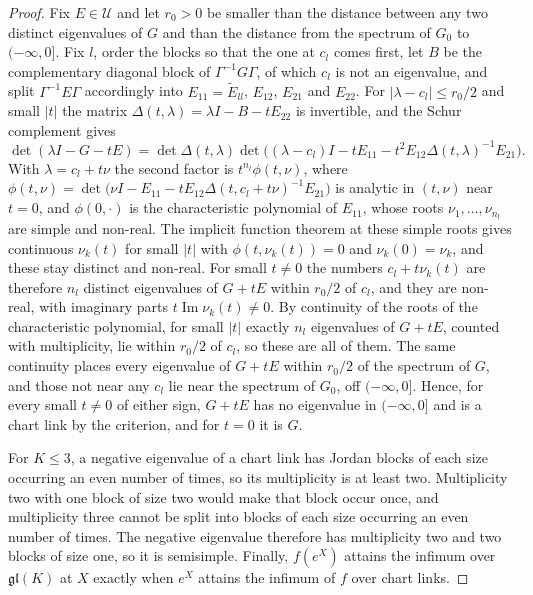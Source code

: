 \documentclass[11pt]{article}
\theoremstyle{definition}
\theoremstyle{remark}
\providecommand{\gl}{\mathfrak{gl}}
\begin{document}
\begin{proof}
Fix $E\in\mathcal U$ and let $r_0>0$ be smaller than the distance between any two distinct eigenvalues of $G$ and than the distance from the spectrum of $G_0$ to $(-\infty,0]$. Fix $l$, order the blocks so that the one at $c_l$ comes first, let $B$ be the complementary diagonal block of $\Gamma^{-1}G\Gamma$, of which $c_l$ is not an eigenvalue, and split $\Gamma^{-1}E\Gamma$ accordingly into $E_{11}=\tilde E_{ll}$, $E_{12}$, $E_{21}$ and $E_{22}$. For $|\lambda-c_l|\le r_0/2$ and small $|t|$ the matrix $\Delta(t,\lambda)=\lambda I-B-tE_{22}$ is invertible, and the Schur complement gives
\begin{equation*}
\det(\lambda I-G-tE)=\det \Delta(t,\lambda)\det\big((\lambda-c_l)I-tE_{11}-t^2E_{12}\Delta(t,\lambda)^{-1}E_{21}\big).
\end{equation*}
With $\lambda=c_l+t\nu$ the second factor is $t^{n_l}\phi(t,\nu)$, where $\phi(t,\nu)=\det\big(\nu I-E_{11}-tE_{12}\Delta(t,c_l+t\nu)^{-1}E_{21}\big)$ is analytic in $(t,\nu)$ near $t=0$, and $\phi(0,\cdot)$ is the characteristic polynomial of $E_{11}$, whose roots $\nu_1,\dots,\nu_{n_l}$ are simple and non-real. The implicit function theorem at these simple roots gives continuous $\nu_k(t)$ for small $|t|$ with $\phi(t,\nu_k(t))=0$ and $\nu_k(0)=\nu_k$, and these stay distinct and non-real. For small $t\ne0$ the numbers $c_l+t\nu_k(t)$ are therefore $n_l$ distinct eigenvalues of $G+tE$ within $r_0/2$ of $c_l$, and they are non-real, with imaginary parts $t\operatorname{Im}\nu_k(t)\ne0$. By continuity of the roots of the characteristic polynomial, for small $|t|$ exactly $n_l$ eigenvalues of $G+tE$, counted with multiplicity, lie within $r_0/2$ of $c_l$, so these are all of them. The same continuity places every eigenvalue of $G+tE$ within $r_0/2$ of the spectrum of $G$, and those not near any $c_l$ lie near the spectrum of $G_0$, off $(-\infty,0]$. Hence, for every small $t\ne0$ of either sign, $G+tE$ has no eigenvalue in $(-\infty,0]$ and is a chart link by the criterion, and for $t=0$ it is $G$.

For $K\le3$, a negative eigenvalue of a chart link has Jordan blocks of each size occurring an even number of times, so its multiplicity is at least two. Multiplicity two with one block of size two would make that block occur once, and multiplicity three cannot be split into blocks of each size occurring an even number of times. The negative eigenvalue therefore has multiplicity two and two blocks of size one, so it is semisimple. Finally, $f(e^X)$ attains the infimum over $\gl(K)$ at $X$ exactly when $e^X$ attains the infimum of $f$ over chart links.
\end{proof}
\end{document}
